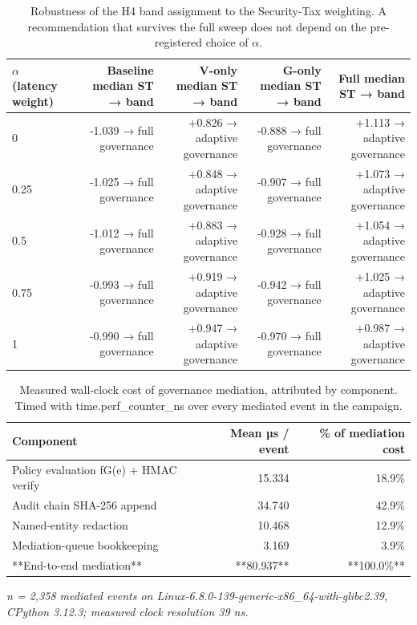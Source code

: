 \begin{table}[htbp]
\centering
\small
\caption{Robustness of the H4 band assignment to the Security-Tax weighting. A recommendation that survives the full sweep does not depend on the pre-registered choice of $\alpha$.}
\label{tab:gmais-7}
\begin{tabular}{lrrrr}
\toprule
$\alpha$ (latency weight) & Baseline median ST → band & V-only median ST → band & G-only median ST → band & Full median ST → band \\
\midrule
0 & -1.039 → full governance & +0.826 → adaptive governance & -0.888 → full governance & +1.113 → adaptive governance \\
0.25 & -1.025 → full governance & +0.848 → adaptive governance & -0.907 → full governance & +1.073 → adaptive governance \\
0.5 & -1.012 → full governance & +0.883 → adaptive governance & -0.928 → full governance & +1.054 → adaptive governance \\
0.75 & -0.993 → full governance & +0.919 → adaptive governance & -0.942 → full governance & +1.025 → adaptive governance \\
1 & -0.990 → full governance & +0.947 → adaptive governance & -0.970 → full governance & +0.987 → adaptive governance \\
\bottomrule
\end{tabular}
\end{table}


\begin{table}[htbp]
\centering
\small
\caption{Measured wall-clock cost of governance mediation, attributed by component. Timed with time.perf\_counter\_ns over every mediated event in the campaign.}
\label{tab:gmais-8}
\begin{tabular}{lrr}
\toprule
Component & Mean µs / event & \% of mediation cost \\
\midrule
Policy evaluation fG(e) + HMAC verify & 15.334 & 18.9\% \\
Audit chain SHA-256 append & 34.740 & 42.9\% \\
Named-entity redaction & 10.468 & 12.9\% \\
Mediation-queue bookkeeping & 3.169 & 3.9\% \\
**End-to-end mediation** & **80.937** & **100.0\%** \\
\bottomrule
\end{tabular}
\par\vspace{2pt}\footnotesize\emph{n = 2,358 mediated events on Linux-6.8.0-139-generic-x86\_64-with-glibc2.39, CPython 3.12.3; measured clock resolution 39 ns.}
\end{table}


